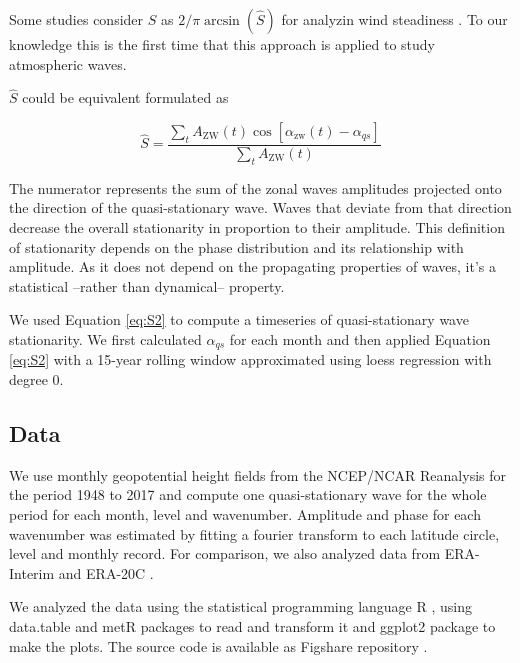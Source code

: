 \documentclass[draft,linenumbers]{agujournal2018}
\begin{document}
Some studies consider \(\hat{S}\) as
\(2/\pi\arcsin \left (\hat{S} \right )\) \citep{singer1967} for analyzin
wind steadiness \citep[e.g][]{hiscox2010}. To our knowledge this is the
first time that this approach is applied to study atmospheric waves.

\(\hat{S}\) could be equivalent formulated as

\begin{linenomath*}
\begin{equation}\label{eq:S2}
\hat{S} =   \frac{\sum_t A_\mathrm{ZW}(t) \cos  \left [\alpha_\mathrm{zw}(t) - \alpha_{qs} \right ]}{\sum_t A_\mathrm{ZW}(t)}
\end{equation}
\end{linenomath*}

The numerator represents the sum of the zonal waves amplitudes projected
onto the direction of the quasi-stationary wave. Waves that deviate from
that direction decrease the overall stationarity in proportion to their
amplitude. This definition of stationarity depends on the phase
distribution and its relationship with amplitude. As it does not depend
on the propagating properties of waves, it's a statistical --rather than
dynamical-- property.

We used Equation \ref{eq:S2} to compute a timeseries of quasi-stationary
wave stationarity. We first calculated \(\alpha_{qs}\) for each month
and then applied Equation \ref{eq:S2} with a 15-year rolling window
approximated using loess regression with degree 0.

\subsection{Data}

We use monthly geopotential height fields from the NCEP/NCAR Reanalysis
\citep{kalnay1996} for the period 1948 to 2017 and compute one
quasi-stationary wave for the whole period for each month, level and
wavenumber. Amplitude and phase for each wavenumber was estimated by
fitting a fourier transform to each latitude circle, level and monthly
record. For comparison, we also analyzed data from ERA-Interim
\citep{dee2011} and ERA-20C \citep{poli2016}.

We analyzed the data using the statistical programming language R
\citep{R-base}, using data.table \citep{R-data.table} and metR
\citep{R-metR} packages to read and transform it and ggplot2 package
\citep{R-ggplot2} to make the plots. The source code is available as
Figshare repository \citep{Campitelli2019-figshare}.
\end{document}
